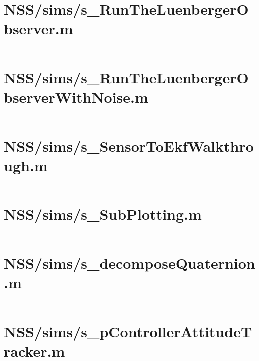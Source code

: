 \pagebreak
\section*{NSS/sims/s\_RunTheLuenbergerObserver.m}\label{code:NSS/sims/s_RunTheLuenbergerObserver.m}
\inputminted[linenos,fontsize=\scriptsize]{matlab}{/home/dcouture/git/mathyourlife/TSatPy/beta_versions/matlab_object_oriented/sims/s_RunTheLuenbergerObserver.m}

\pagebreak
\section*{NSS/sims/s\_RunTheLuenbergerObserverWithNoise.m}\label{code:NSS/sims/s_RunTheLuenbergerObserverWithNoise.m}
\inputminted[linenos,fontsize=\scriptsize]{matlab}{/home/dcouture/git/mathyourlife/TSatPy/beta_versions/matlab_object_oriented/sims/s_RunTheLuenbergerObserverWithNoise.m}

\pagebreak
\section*{NSS/sims/s\_SensorToEkfWalkthrough.m}\label{code:NSS/sims/s_SensorToEkfWalkthrough.m}
\inputminted[linenos,fontsize=\scriptsize]{matlab}{/home/dcouture/git/mathyourlife/TSatPy/beta_versions/matlab_object_oriented/sims/s_SensorToEkfWalkthrough.m}

\pagebreak
\section*{NSS/sims/s\_SubPlotting.m}\label{code:NSS/sims/s_SubPlotting.m}
\inputminted[linenos,fontsize=\scriptsize]{matlab}{/home/dcouture/git/mathyourlife/TSatPy/beta_versions/matlab_object_oriented/sims/s_SubPlotting.m}

\pagebreak
\section*{NSS/sims/s\_decomposeQuaternion.m}\label{code:NSS/sims/s_decomposeQuaternion.m}
\inputminted[linenos,fontsize=\scriptsize]{matlab}{/home/dcouture/git/mathyourlife/TSatPy/beta_versions/matlab_object_oriented/sims/s_decomposeQuaternion.m}

\pagebreak
\section*{NSS/sims/s\_pControllerAttitudeTracker.m}\label{code:NSS/sims/s_pControllerAttitudeTracker.m}
\inputminted[linenos,fontsize=\scriptsize]{matlab}{/home/dcouture/git/mathyourlife/TSatPy/beta_versions/matlab_object_oriented/sims/s_pControllerAttitudeTracker.m}

